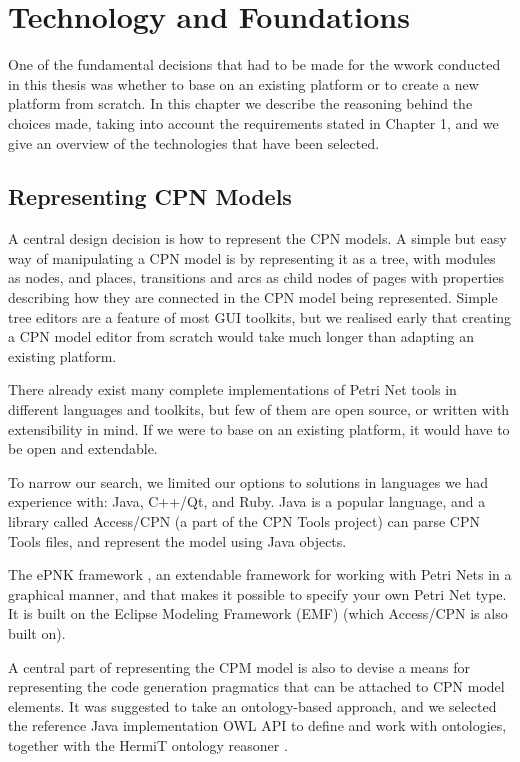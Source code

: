 \chapter{Technology and Foundations}
\label{chap:technology}

One of the fundamental decisions that had to be made for the wwork conducted
in this thesis was whether to base \thename{} on an existing platform or to
create a new platform from scratch. In this chapter we describe the
reasoning behind the choices made, taking into account the requirements stated
in Chapter 1, and we give an overview of the technologies that have been
selected.

\section{Representing CPN Models}
	
	A central design decision is how to represent the CPN models. A simple
	but easy way of manipulating a CPN model is by representing it as a tree, with
	modules as nodes, and places, transitions and arcs as child nodes of pages with
	properties describing how they are connected in the CPN model being
	represented. Simple tree editors are a feature of most GUI toolkits,
	but we realised early that creating a CPN model editor from scratch would take
	much longer than adapting an existing platform.

	There already exist many complete implementations of Petri Net tools in
	different languages and toolkits, but few of them are open source, or written
	with extensibility in mind. If we were to base \thename{} on an existing
	platform, it would have to be open and extendable. 
	
	To narrow our search, we limited our options to solutions in
	languages we had experience with: Java, C++/Qt, and Ruby. Java is a popular
	language, and a library called Access/CPN \cite{accesscpn} (a part of the CPN
	Tools project) can parse CPN Tools files, and represent the model using Java
	objects.
	
	The ePNK framework \cite{kindler2011epnk}, an extendable framework for working
	with Petri Nets in a graphical manner, and that makes it possible to specify
	your own Petri Net type. It is built on the Eclipse Modeling Framework (EMF)
	\cite{steinberg2008emf} (which Access/CPN is also built on). 

	A central part of representing the CPM model is also to devise a means for
	representing the code generation pragmatics that can be attached to CPN model
	elements. It was suggested to take an ontology-based approach, and we selected
	the reference Java implementation OWL API \cite{horridge2009owl} to define and work
	with ontologies, together with the HermiT ontology reasoner
	\cite{shearer2008hermit}.
	
